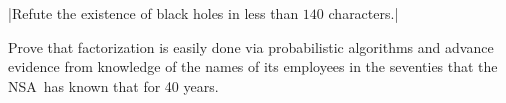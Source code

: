 \documentclass{article}
\begin{document}
\Scontents*|Refute the existence of black holes in less than $140$ characters.|
\begin{scontents}[write-env=\jobname.txt]
\def\NSA{NSA}%
Prove that factorization is easily done via probabilistic algorithms and
advance evidence from knowledge of the names of its employees in the
seventies that the \NSA\ has known that for 40 years.\par
\end{scontents}
\begin{itemize}
\end{itemize}
\section{}
\end{document}

